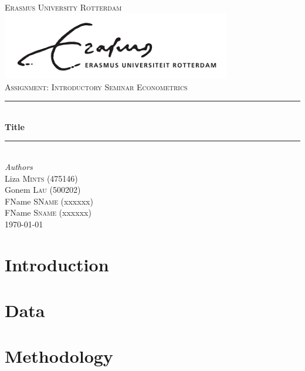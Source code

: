 \documentclass{article}
\begin{document}
\begin{titlepage} 
    \newcommand{\HRule}{\rule{\linewidth}{0.5mm}} 
    \center
    \textsc{\LARGE Erasmus University Rotterdam}                    \\ [0.5cm] 
    \includegraphics[width=0.75\textwidth]{ErasmusUniversiteit.png} \\
    \textsc{\Large Assignment: Introductory Seminar Econometrics}   \\
    \HRule                        \\ [0.5cm]
    {\LARGE\bfseries {Title}}     \\ [0.2cm]
    \HRule                        \\ [0.5cm]
    {\large\textit{Authors}}      \\ [0.5cm]
    Liza  \textsc{Mints} (475146) \\ [0.5cm]
    Gonem \textsc{Lau}   (500202) \\ [0.5cm]
    FName \textsc{SName} (xxxxxx) \\ [0.5cm]
    FName \textsc{Sname} (xxxxxx) \\ [0.5cm]
    {\today}                      \\ [0.5cm]
    \begin{abstract} %
        
    \end{abstract} 
\end{titlepage}

\section{Introduction} \label{sec:introduction}


\section{Data} \label{sec:data}


\section{Methodology} \label{sec:methodology}

\end{document}

